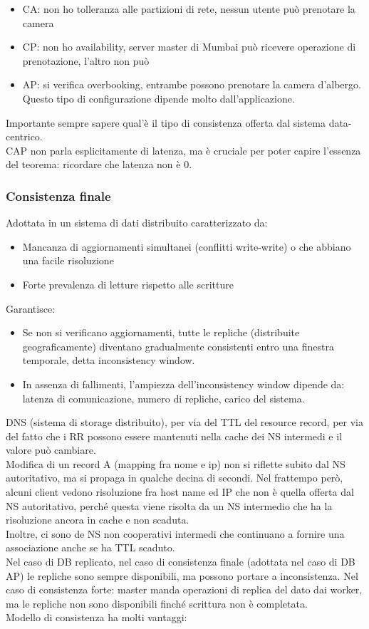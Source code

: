 \documentclass[16px]{article}
\begin{document}
\begin{itemize}
\item CA: non ho tolleranza alle partizioni di rete, nessun utente può prenotare la camera
\item CP: non ho availability, server master di Mumbai può ricevere operazione di prenotazione, l'altro non può
\item AP: si verifica overbooking, entrambe possono prenotare la camera d'albergo. Questo tipo di configurazione dipende molto dall'applicazione.
\end{itemize}
Importante sempre sapere qual'è il tipo di consistenza offerta dal sistema data-centrico.\\ CAP non parla esplicitamente di latenza, ma è  cruciale per poter capire l'essenza del teorema: ricordare che latenza non è 0.
\subsubsection{Consistenza finale}
Adottata in un sistema di dati distribuito caratterizzato da:
\begin{itemize}
\item Mancanza di aggiornamenti simultanei (conflitti write-write) o che abbiano una facile risoluzione
\item Forte prevalenza di letture rispetto alle scritture
\end{itemize}
Garantisce:
\begin{itemize}
\item Se non si verificano aggiornamenti, tutte le repliche (distribuite geograficamente) diventano gradualmente consistenti entro una finestra temporale, detta inconsistency window.
\item In assenza di fallimenti, l'ampiezza dell'inconsistency window dipende da: latenza di comunicazione, numero di repliche, carico del sistema.
\end{itemize}
DNS (sistema di storage distribuito), per via del TTL del resource record, per via del fatto che i RR possono essere mantenuti nella cache dei NS intermedi e il valore può cambiare.\\ Modifica di un record A (mapping fra nome e ip) non si riflette subito dal NS autoritativo, ma si propaga in qualche decina di secondi. Nel frattempo però, alcuni client vedono risoluzione fra host name ed IP che non è quella offerta dal NS autoritativo, perché questa viene risolta da un NS intermedio che ha la risoluzione ancora in cache e non scaduta.\\ Inoltre, ci sono de NS non cooperativi intermedi che continuano a fornire una associazione anche se ha TTL scaduto.\\ Nel caso di DB replicato, nel caso di consistenza finale (adottata nel caso di DB AP) le repliche sono sempre disponibili, ma possono portare a inconsistenza. Nel caso di consistenza forte: master manda operazioni di replica del dato dai worker, ma le repliche non sono disponibili finché scrittura non è completata.\\ Modello di consistenza ha molti vantaggi:
\end{document}
